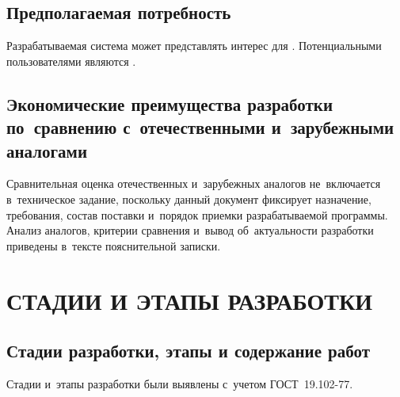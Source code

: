 \documentclass[12pt,a4paper]{extarticle}
\begin{document}
\subsection{Предполагаемая потребность}

Разрабатываемая система может представлять интерес для . Потенциальными пользователями являются .

\subsection{Экономические преимущества разработки по~сравнению с~отечественными и~зарубежными аналогами}

Сравнительная оценка отечественных и~зарубежных аналогов не~включается в~техническое задание, поскольку данный документ фиксирует назначение, требования, состав поставки и~порядок приемки разрабатываемой программы. Анализ аналогов, критерии сравнения и~вывод об~актуальности разработки приведены в~тексте пояснительной записки.

\clearpage

\section{СТАДИИ И ЭТАПЫ РАЗРАБОТКИ}

\subsection{Стадии разработки, этапы и содержание работ}

Стадии и~этапы разработки были выявлены с~учетом ГОСТ~19.102-77\cite{gost19102}.
\end{document}
